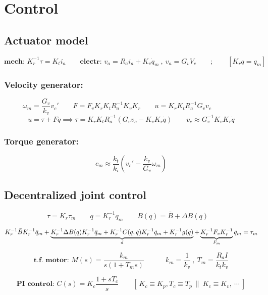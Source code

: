 \section{Control}

\subsection{Actuator model}
$$
\textbf{mech:  }
K_r^{-1} \tau = K_t i_a
\qquad
\textbf{electr:  }
v_a = R_ai_a + K_v \dot{q}_m
\ , \
v_a = G_vV_c
\qquad
;
\qquad
\left[ K_r q = q_m \right]
$$

\subsubsection{Velocity generator: }
$$
\omega_m = \frac{G_v}{k_v} v_c'
\qquad
F = F_v K_r K_t R_a^{-1} K_v K_r 
\qquad
u = K_r K_t R_a^{-1} G_v v_c
\qquad
\qquad
$$
$$
u = \tau + F\dot{q} 
\implies
\tau = K_r K_t R_a^{-1} (G_vv_c - K_vK_r\dot{q})
\qquad
v_c \approx G_v^{-1} K_v K_r \dot{q}
$$

\subsubsection{Torque generator: }
$$
c_m \approx \frac{k_t}{k_i} ( v_c' - \frac{k_v}{G_v}\omega_m)
$$



\subsection{Decentralized joint control}
$$
\tau = K_r \tau_m
\qquad
q = K_r^{-1}q_m
\qquad
B(q) = \bar{B} + \Delta B(q) \quad 
$$

$$
K_r^{-1} \bar{B} K_r^{-1} \ddot{q}_m + 
\underbrace{
 K_r^{-1}\Delta B(q) K_r^{-1} \ddot{q}_m +
 K_r^{-1}C(q, \dot{q})K_r^{-1}\dot{q}_m +  K_r^{-1}g(q)
}_{d}
+  
\underbrace{K_r^{-1}F_vK_r^{-1}}_{F_m}\dot{q}_m = \tau_m \\
$$

$$
\textbf{t.f. motor:  } M(s) = \frac{k_m}{s(1+T_ms)}
\qquad \quad
k_m = \frac{1}{k_v}
\ , \
T_m = \frac{R_a I}{k_t k_v}
$$

$$
\textbf{PI control:  } C(s) = K_c \frac{1+sT_c}{s}
\qquad
\left[ \ K_c \equiv K_p, T_c \equiv T_p \ \| \ K_c \equiv K_v, \ \cdots \ \right]
$$

